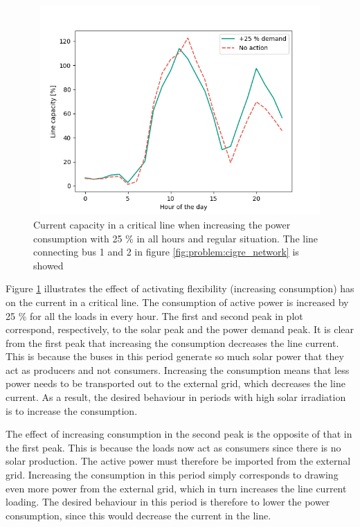 \documentclass[class=book, crop=false, 11pt]{standalone}
\begin{document}
\begin{figure}[ht]
    \center
\includegraphics[height=8cm, width=12cm]{figures/increase_demand_current.png}
    \caption[size = 9]{Current capacity in a critical line when increasing the power consumption with 25 \% in all hours and regular situation. The line connecting bus 1 and 2 in figure \ref{fig:problem:cigre_network} is showed}
    \label{fig:results:increase_demand_current}
\end{figure}

Figure \ref{fig:results:increase_demand_current} illustrates the effect of activating flexibility (increasing consumption) has on the current in a critical line. The consumption of active power is increased by 25 \% for all the loads in every hour. The first and second peak in plot correspond, respectively, to the solar peak and the power demand peak. It is clear from the first peak that increasing the consumption decreases the line current. This is because the buses in this period generate so much solar power that they act as producers and not consumers. Increasing the consumption means that less power needs to be transported out to the external grid, which decreases the line current. As a result, the desired behaviour in periods with high solar irradiation is to increase the consumption.

The effect of increasing consumption in the second peak is the opposite of that in the first peak. This is because the loads now act as consumers since there is no solar production. The active power must therefore be imported from the external grid. Increasing the consumption in this period simply corresponds to drawing even more power from the external grid, which in turn increases the line current loading. The desired behaviour in this period is therefore to lower the power consumption, since this would decrease the current in the line. 
\end{document}
